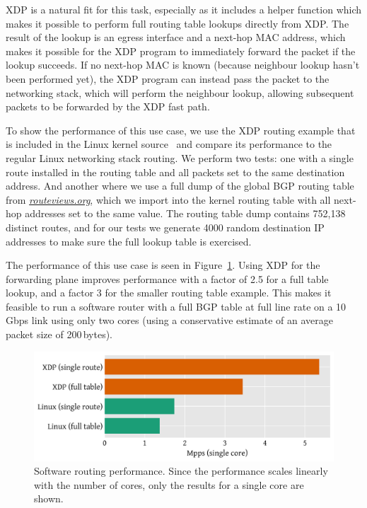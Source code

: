\documentclass[10pt,sigconf]{acmart}
\begin{document}
XDP is a natural fit for this task, especially as it includes a helper function
which makes it possible to perform full routing table lookups directly from XDP.
The result of the lookup is an egress interface and a next-hop MAC address,
which makes it possible for the XDP program to immediately forward the packet if
the lookup succeeds. If no next-hop MAC is known (because neighbour lookup
hasn't been performed yet), the XDP program can instead pass the packet to the
networking stack, which will perform the neighbour lookup, allowing subsequent
packets to be forwarded by the XDP fast path.

To show the performance of this use case, we use the XDP routing example that is
included in the Linux kernel source~\cite{fwd-example} and compare its
performance to the regular Linux networking stack routing. We perform two tests:
one with a single route installed in the routing table and all packets set to
the same destination address. And another where we use a full dump of the global
BGP routing table from \emph{\url{routeviews.org}}, which we import into the
kernel routing table with all next-hop addresses set to the same value. The
routing table dump contains 752,138 distinct routes, and for our tests we
generate 4000 random destination IP addresses to make sure the full lookup table
is exercised.

The performance of this use case is seen in Figure~\ref{fig:router-fwd}. Using
XDP for the forwarding plane improves performance with a factor of 2.5 for a
full table lookup, and a factor 3 for the smaller routing table example. This
makes it feasible to run a software router with a full BGP table at full line
rate on a 10\,Gbps link using only two cores (using a conservative estimate of
an average packet size of 200\,bytes).

\begin{figure}[t]
\centering
\includegraphics[width=\linewidth]{figures/router-fwd.pdf}
\caption{\label{fig:router-fwd} Software routing performance. Since the
  performance scales linearly with the number of cores, only the results for a
  single core are shown.}
\end{figure}
\end{document}
